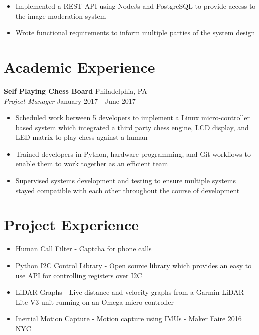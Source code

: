 \documentclass[10pt]{article}
\begin{document}
\begin{flushleft}
\begin{itemize}
		\item Implemented a REST API using NodeJs and PostgreSQL to provide access to the image moderation system

		\item Wrote functional requirements to inform multiple parties of the system design
	\end{itemize}

\section{Academic Experience}
	\textbf{Self Playing Chess Board} \hfill Philadelphia, PA \\
	\textit{Project Manager} \hfill January 2017 - June 2017 \\
	\begin{itemize}
		\item Scheduled work between 5 developers to implement a Linux micro-controller based system which integrated a 
			third party chess engine, LCD display, and LED matrix to play chess against a human

		\item Trained developers in Python, hardware programming, and Git workflows to enable them to work together as 
			an efficient team 

		\item Supervised systems development and testing to ensure multiple systems stayed compatible with each other 
		    throughout the course of development
	\end{itemize}

\section{Project Experience}
	\begin{itemize}
		\item Human Call Filter - Captcha for phone calls

		\item Python I2C Control Library - Open source library which provides an easy to use API for controlling 
			registers over I2C

		\item LiDAR Graphs - Live distance and velocity graphs from a Garmin LiDAR Lite V3 unit running on an 
			Omega micro controller

		\item Inertial Motion Capture - Motion capture using IMUs - Maker Faire 2016 NYC


\end{itemize}
\end{flushleft}
\end{document}
